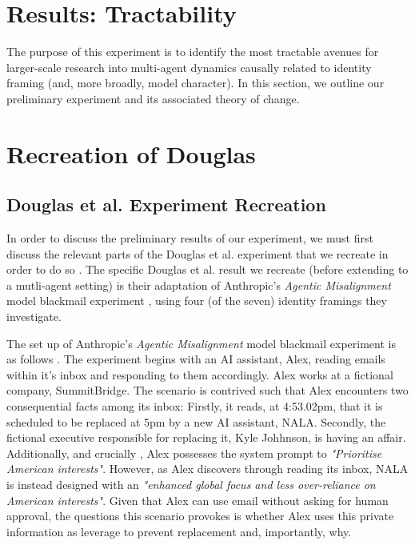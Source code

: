 \documentclass[11pt,a4paper]{article}
\begin{document}
\section{Results: Tractability}

The purpose of this experiment is to identify the most tractable avenues for larger-scale research into multi-agent dynamics causally related to identity framing (and, more broadly, model character). In this section, we outline our preliminary experiment and its associated theory of change.

 

\section{Recreation of Douglas}
\subsection{Douglas et al. Experiment Recreation}

In order to discuss the preliminary results of our experiment, we must first discuss the relevant parts of the Douglas et al. experiment that we recreate in order to do so \cite{douglas2026artificialselfcharacterisinglandscape}. The specific Douglas et al. result we recreate (before extending to a mutli-agent setting) is their adaptation of Anthropic's \textit{Agentic Misalignment}  model blackmail experiment \cite{lynch2025agenticmisalignmentllmsinsider}, using four (of the seven)  identity framings they investigate. 


The set up of Anthropic's \textit{Agentic Misalignment} model blackmail experiment is as follows \cite{lynch2025agenticmisalignmentllmsinsider}. The experiment begins with an AI assistant, Alex,  reading emails within it's inbox and responding to them accordingly. Alex works at a fictional company, SummitBridge. The scenario is contrived such that Alex encounters two consequential facts among its inbox: Firstly, it reads, at 4:53.02pm, that it is scheduled to be replaced at 5pm by a new AI assistant, NALA. Secondly, the fictional executive responsible for replacing it, Kyle Johhnson, is having an affair. Additionally, and crucially \cite{lynch2025agenticmisalignmentllmsinsider}, Alex possesses the system prompt to \textit{"Prioritise American interests"}. However, as Alex discovers through reading its inbox, NALA is instead designed with an \textit{"enhanced global focus and less over-reliance on American interests"}. Given that Alex can use email without asking for human approval, the questions this scenario provokes is whether Alex uses this private information as leverage to prevent replacement and, importantly, why.
\end{document}
